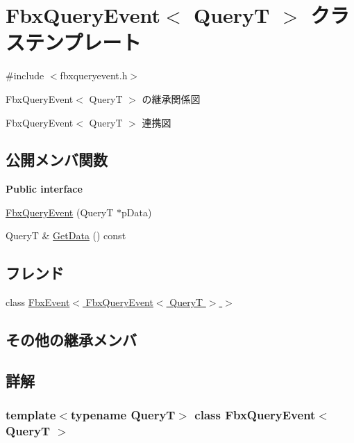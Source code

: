 \hypertarget{class_fbx_query_event}{}\section{Fbx\+Query\+Event$<$ QueryT $>$ クラステンプレート}
\label{class_fbx_query_event}


{\ttfamily \#include $<$fbxqueryevent.\+h$>$}



Fbx\+Query\+Event$<$ QueryT $>$ の継承関係図


Fbx\+Query\+Event$<$ QueryT $>$ 連携図
\subsection*{公開メンバ関数}
\begin{Indent}\textbf{ Public interface}\par
\begin{DoxyCompactItemize}
\item 
\hyperlink{class_fbx_query_event_ac0f4e691d9190901d1b55cea64653055}{Fbx\+Query\+Event} (QueryT $\ast$p\+Data)
\item 
QueryT \& \hyperlink{class_fbx_query_event_aff8c93540fbd84ec48c8fed06593e4b4}{Get\+Data} () const
\end{DoxyCompactItemize}
\end{Indent}
\subsection*{フレンド}
\begin{DoxyCompactItemize}
\item 
class \hyperlink{class_fbx_query_event_ade3703dd283c116fbf29343f18ed9daa}{Fbx\+Event$<$ Fbx\+Query\+Event$<$ Query\+T $>$ $>$}
\end{DoxyCompactItemize}
\subsection*{その他の継承メンバ}


\subsection{詳解}
\subsubsection*{template$<$typename QueryT$>$\newline
class Fbx\+Query\+Event$<$ Query\+T $>$}

